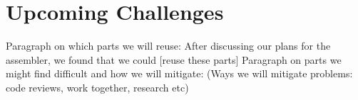 \documentclass[10pt]{article}
\begin{document}
\section*{Upcoming Challenges}
Paragraph on which parts we will reuse:
After discussing our plans for the assembler, we found that we could [reuse these parts]
Paragraph on parts we might find difficult and how we will mitigate:
(Ways we will mitigate problems: code reviews, work together, research etc)
\end{document}
